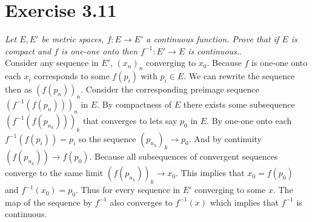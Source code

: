 \documentclass{amsart}
\begin{document}
    \section{Exercise 3.11}
    \emph{Let $E, E'$ be metric spaces, $f: E \rightarrow E'$ a continuous function. Prove that if $E$ 
    is compact and $f$ is one-one onto then $f^{-1}: E' \rightarrow E$ is continuous.}.\\
    Consider any sequence in $E'$, $(x_n)_n$ converging to $x_0$. Because $f$ is one-one onto each $x_i$ corresponds to some $f(p_i)$ with  $p_i \in E$.
    We can rewrite the sequence then as $(f(p_n))_n$. Consider the corresponding preimage sequence $(f^{-1}(f(p_n)))_n$ in $E$.
    By compactness of $E$ there exists some subsequence $(f^{-1}(f(p_{n_k})))_k$ that converges to lets say $p_0$ in $E$.
    By one-one onto each $f^{-1}(f(p_i)) = p_i$ so the sequence $(p_{n_k})_k \rightarrow p_0$.
    And by continuity $(f(p_{n_k})) \rightarrow f(p_0)$.
    Because all subsequences of convergent sequences converge to the same limit $(f(p_{n_k}))_k \rightarrow x_0$. This implies that $x_0 = f(p_0)$ and $f^{-1}(x_0) = p_0$. Thus for every sequence in $E'$ converging to some $x$. The map of the 
    sequence by $f^{-1}$ also converges to $f^{-1}(x)$ which implies that $f^{-1}$ is continuous.
\end{document}
